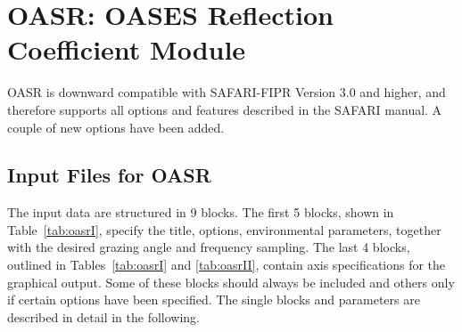 \section{    OASR: OASES Reflection Coefficient Module}

    OASR  is downward compatible with SAFARI-FIPR  Version 
3.0  and higher, and therefore supports all options and  features 
described in the SAFARI manual. A couple of new options have been added.

\subsection{Input Files for OASR}

The input data are structured in 9 blocks. The first 5 blocks, shown in 
Table~\ref{tab:oasrI}, specify the title, options, 
environmental parameters, together with the desired grazing angle and frequency
sampling. The last 4 blocks, outlined in 
Tables~\ref{tab:oasrI} and \ref{tab:oasrII}, contain axis specifications
for the graphical output. Some of these blocks
should always be included and others only if certain 
options have been specified. The single blocks and parameters are
described in detail in the following.

